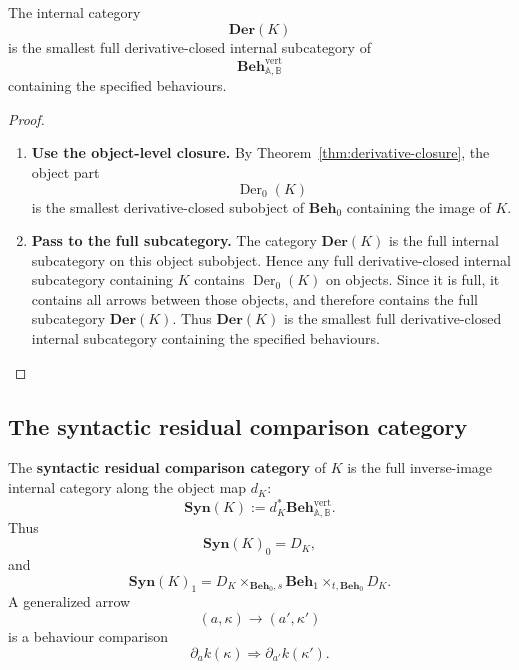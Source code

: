 \begin{theorem}
\label{thm:generated-residual-behaviour-category}
    The internal category
    \[
        \mathbf{Der}(K)
    \]
    is the smallest full derivative-closed internal subcategory of
    \[
        \mathbf{Beh}^{\mathrm{vert}}_{\mathbb A,\mathbb B}
    \]
    containing the specified behaviours.
\end{theorem}
\begin{proof}
    \leavevmode
    \begin{enumerate}
        \item \textbf{Use the object-level closure.} By Theorem~\ref{thm:derivative-closure}, the object part
        \[
            \operatorname{Der}_0(K)
        \]
        is the smallest derivative-closed subobject of \(\mathbf{Beh}_0\) containing the image of \(K\).

        \item \textbf{Pass to the full subcategory.} The category \(\mathbf{Der}(K)\) is the full internal subcategory on this object subobject. Hence any full derivative-closed internal subcategory containing \(K\) contains \(\operatorname{Der}_0(K)\) on objects. Since it is full, it contains all arrows between those objects, and therefore contains the full subcategory \(\mathbf{Der}(K)\). Thus \(\mathbf{Der}(K)\) is the smallest full derivative-closed internal subcategory containing the specified behaviours.
    \end{enumerate}
\end{proof}

\subsection{The syntactic residual comparison category}
\label{subsec:syntactic-residual-comparison-category}

\begin{definition}
\label{def:syntactic-residual-comparison-category}
    The \textbf{syntactic residual comparison category} of \(K\) is the full inverse-image internal category along the object map \(d_K\):
    \[
        \mathbf{Syn}(K):=d_K^*
        \mathbf{Beh}^{\mathrm{vert}}_{\mathbb A,\mathbb B}.
    \]
    Thus
    \[
        \mathbf{Syn}(K)_0=D_K,
    \]
    and
    \[
        \mathbf{Syn}(K)_1
        =
        D_K
        \times_{\mathbf{Beh}_0,s}
        \mathbf{Beh}_1
        \times_{t,\mathbf{Beh}_0}
        D_K.
    \]
    A generalized arrow
    \[
        (a,\kappa)\to(a',\kappa')
    \]
    is a behaviour comparison
    \[
        \partial_a k(\kappa)
        \Rightarrow
        \partial_{a'} k(\kappa').
    \]
\end{definition}

